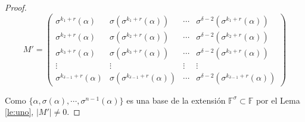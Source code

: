 \begin{proof}
\[  M' =  \left( \begin{array}{cccc}
	\sigma^{k_1+r}(\alpha) &\sigma(\sigma^{k_1+r}(\alpha)) & \cdots & \sigma^{\delta-2}(\sigma^{k_1+r}(\alpha)) \\
	\sigma^{k_2+r}(\alpha) & \sigma(\sigma^{k_2+r}(\alpha))& \cdots &\sigma^{\delta-2}(\sigma^{k_2+r}(\alpha)) \\
   \sigma^{k_3+r}(\alpha) & \sigma(\sigma^{k_3+r}(\alpha)) & \cdots &\sigma^{\delta-2}(\sigma^{k_3+r}(\alpha)) \\
    \vdots & \vdots  & \vdots & \vdots  \\
	\sigma^{k_{\delta-1}+r}(\alpha) & \sigma(\sigma^{k_{\delta-1}+r}(\alpha)) & \cdots &\sigma^{\delta-2}(\sigma^{k_{\delta-1}+r}(\alpha))
			\end{array} 
	\right) 
\]

Como $\{ \alpha, \sigma(\alpha),\cdots,\sigma^{n-1}(\alpha) \}$ es una base de la extensión $\mathbb{F}^{\sigma} \subset \mathbb{F}$ por el Lema \ref{le:uno}, $\mid M' \mid \neq 0$.
\end{proof}

